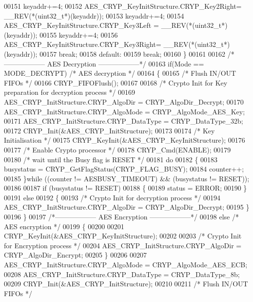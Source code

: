 \begin{DoxyCode}
00151     keyaddr+=4;
00152     AES\_CRYP\_KeyInitStructure.CRYP_Key2Right= \_\_REV(*(uint32\_t*)(keyaddr));
00153     keyaddr+=4;
00154     AES\_CRYP\_KeyInitStructure.CRYP_Key3Left = \_\_REV(*(uint32\_t*)(keyaddr));
00155     keyaddr+=4;
00156     AES\_CRYP\_KeyInitStructure.CRYP_Key3Right= \_\_REV(*(uint32\_t*)(keyaddr));
00157     \textcolor{keywordflow}{break};
00158     \textcolor{keywordflow}{default}:
00159     \textcolor{keywordflow}{break};
00160   \}
00161 
00162   \textcolor{comment}{/*------------------ AES Decryption ------------------*/}
00163   \textcolor{keywordflow}{if}(Mode == MODE_DECRYPT) \textcolor{comment}{/* AES decryption */}
00164   \{
00165     \textcolor{comment}{/* Flush IN/OUT FIFOs */}
00166     CRYP_FIFOFlush();
00167 
00168     \textcolor{comment}{/* Crypto Init for Key preparation for decryption process */}
00169     AES\_CRYP\_InitStructure.CRYP_AlgoDir = CRYP_AlgoDir_Decrypt;
00170     AES\_CRYP\_InitStructure.CRYP_AlgoMode = CRYP_AlgoMode_AES_Key;
00171     AES\_CRYP\_InitStructure.CRYP_DataType = CRYP_DataType_32b;
00172     CRYP_Init(&AES\_CRYP\_InitStructure);
00173 
00174     \textcolor{comment}{/* Key Initialisation */}
00175     CRYP_KeyInit(&AES\_CRYP\_KeyInitStructure);
00176 
00177     \textcolor{comment}{/* Enable Crypto processor */}
00178     CRYP_Cmd(ENABLE);
00179 
00180     \textcolor{comment}{/* wait until the Busy flag is RESET */}
00181     \textcolor{keywordflow}{do}
00182     \{
00183       busystatus = CRYP_GetFlagStatus(CRYP_FLAG_BUSY);
00184       counter++;
00185     \}\textcolor{keywordflow}{while} ((counter != AESBUSY_TIMEOUT) && (busystatus != RESET));
00186 
00187     \textcolor{keywordflow}{if} (busystatus != RESET)
00188    \{
00189        status = ERROR;
00190     \}
00191     \textcolor{keywordflow}{else}
00192     \{
00193       \textcolor{comment}{/* Crypto Init for decryption process */}  
00194       AES\_CRYP\_InitStructure.CRYP_AlgoDir = CRYP_AlgoDir_Decrypt;
00195     \}
00196   \}
00197   \textcolor{comment}{/*------------------ AES Encryption ------------------*/}
00198   \textcolor{keywordflow}{else} \textcolor{comment}{/* AES encryption */}
00199   \{
00200 
00201     CRYP_KeyInit(&AES\_CRYP\_KeyInitStructure);
00202 
00203     \textcolor{comment}{/* Crypto Init for Encryption process */}
00204     AES\_CRYP\_InitStructure.CRYP_AlgoDir  = CRYP_AlgoDir_Encrypt;
00205   \}
00206 
00207   AES\_CRYP\_InitStructure.CRYP_AlgoMode = CRYP_AlgoMode_AES_ECB;
00208   AES\_CRYP\_InitStructure.CRYP_DataType = CRYP_DataType_8b;
00209   CRYP_Init(&AES\_CRYP\_InitStructure);
00210 
00211   \textcolor{comment}{/* Flush IN/OUT FIFOs */}

\end{DoxyCode}
